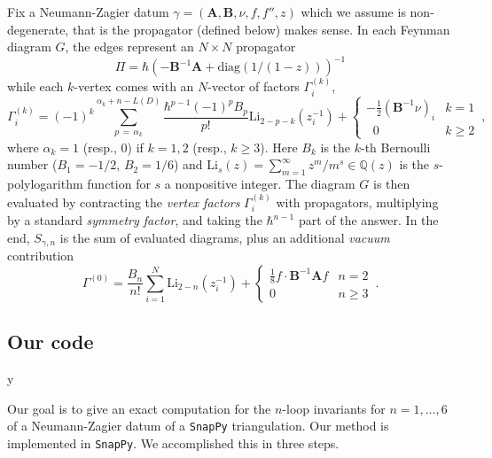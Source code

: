 \documentclass[12pt]{amsart}
\theoremstyle{definition}
\def\printname#1{
        \if\draft y
                \smash{\makebox[0pt]{\hspace{-0.5in}
                        \raisebox{8pt}{\tt\tiny #1}}}
        \fi
}
\def\lbl#1{\label{#1}\printname{#1}}
\def\BQ{\mathbb Q}
\def\ga{\gamma}
\def\Li{\mathrm{Li}}
\newcommand{\mb}{\mathbf}
\begin{document}
Fix a Neumann-Zagier datum $\ga=(\mb A, \mb B, \nu, f, f'', z)$ which
we assume is non-degenerate, that is the propagator (defined below) makes
sense. 
In each Feynman diagram $G$, the edges represent an $N\times N$ propagator
$$
\Pi=\hbar \left( -\mb B^{-1}\mb A+\mathrm{diag}(1/(1-z)) \right)^{-1}
$$
while each $k$-vertex comes with an $N$-vector of factors $\Gamma^{(k)}_i$,
$$
\Gamma^{(k)}_i = (-1)^k\sum_{p\,
=\,\alpha_k}^{\alpha_k +n-L(D)}\frac{\hbar^{p-1}(-1)^p B_p}{p!}\Li_{2-p-k}(z_i^{-1}) 
+ \begin{cases} -\tfrac12(\mb B^{-1}\nu)_i & k= 1 \\ \;\;0 & k \geq 2 
\end{cases}\,,
$$
%
where $\alpha_k = 1$ (resp., $0$) if $k=1,2$ (resp., $k\geq 3$).
Here $B_k$ is the $k$-th Bernoulli number ($B_1=-1/2$, $B_2=1/6$) and
$\Li_s(z)=\sum_{m=1}^\infty z^m/m^s \in \BQ(z)$ is the $s$-polylogarithm
function for $s$ a nonpositive integer.
The diagram $G$ is then evaluated by contracting the \emph{vertex factors} 
$\Gamma^{(k)}_i$ with 
propagators, multiplying by a standard {\em symmetry factor}, and taking the 
$\hbar^{n-1}$ part of the answer. In the end, $S_{\ga,n}$ is the sum of 
evaluated diagrams, plus an additional {\em vacuum} contribution
$$
\Gamma^{(0)} = \frac{B_n}{n!}\sum_{i=1}^N\Li_{2-n}(z_i^{-1}) 
+ \begin{cases} \tfrac18f\cdot\mb B^{-1}\mb Af & n=2 \\ 0 & n\geq 3 
\end{cases}\,.
$$

\subsection{Our code}
\lbl{sub.code}

Our goal is to give an exact computation for the $n$-loop invariants
for $n=1,\dots,6$ of a Neumann-Zagier datum of a \texttt{SnapPy}
triangulation. Our method is implemented in \texttt{SnapPy}.
We accomplished this in three steps.
\end{document}
